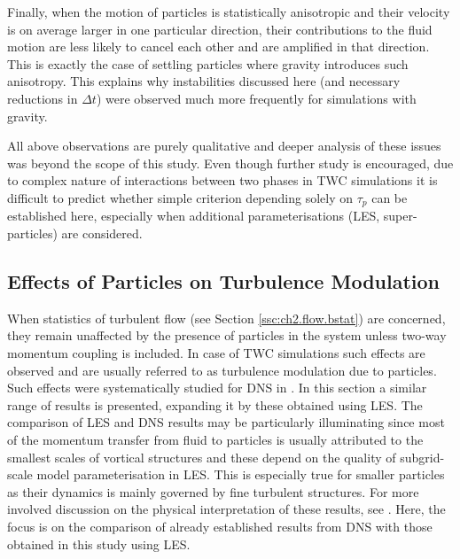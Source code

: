 \documentclass{pracamgren}
\begin{document}
Finally, when the motion of particles is statistically anisotropic and their velocity is on average larger in one particular direction, their contributions to the fluid motion are less likely to cancel each other and are amplified in that direction.
This is exactly the case of settling particles where gravity introduces such anisotropy.
This explains why instabilities discussed here (and necessary reductions in $\Delta t$) were observed much more frequently for simulations with gravity.

All above observations are purely qualitative and deeper analysis of these issues was beyond the scope of this study.
Even though further study is encouraged, due to complex nature of interactions between two phases in TWC simulations it is difficult to predict whether simple criterion depending solely on $\tau_p$ can be established here, especially when additional parameterisations (LES, super-particles) are considered.



\subsection{Effects of Particles on Turbulence Modulation}
\label{ssc:ch2.flow.twc}

When statistics of turbulent flow (see Section \ref{ssc:ch2.flow.bstat}) are concerned, they remain unaffected by the presence of particles in the system unless two-way momentum coupling is included.
In case of TWC simulations such effects are observed and are usually referred to as turbulence modulation due to particles.
Such effects were systematically studied for DNS in \textcite{Rosa2020}.
In this section a similar range of results is presented, expanding it by these obtained using LES.
The comparison of LES and DNS results may be particularly illuminating since most of the momentum transfer from fluid to particles is usually attributed to the smallest scales of vortical structures and these depend on the quality of subgrid-scale model parameterisation in LES.
This is especially true for smaller particles as their dynamics is mainly governed by fine turbulent structures. 
For more involved discussion on the physical interpretation of these results, see \textcite{Rosa2020}.
Here, the focus is on the comparison of already established results from DNS with those obtained in this study using LES.
\end{document}

